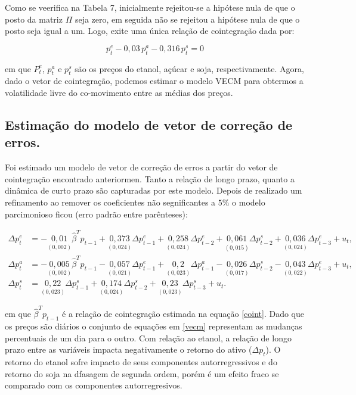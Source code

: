 \documentclass[]{article}
\begin{document}
Como se veerifica na Tabela 7, inicialmente rejeitou-se a hipótese nula
de que o posto da matriz \(\Pi\) seja zero, em seguida não se rejeitou a
hipótese nula de que o posto seja igual a um. Logo, exite uma única
relação de cointegração dada por:

\begin{equation}\label{coint}
p_t^e-0,03\,p_t^a-0,316\,p_t^s=0
\end{equation}

em que \(P_t^e\), \(p_t^a\) e \(p_t^s\) são os preços do etanol, açúcar
e soja, respectivamente. Agora, dado o vetor de cointegração, podemos
estimar o modelo VECM para obtermos a volatilidade livre do co-movimento
entre as médias dos preços.

\subsection{Estimação do modelo de vetor de correção de
erros.}\label{estimacao-do-modelo-de-vetor-de-correcao-de-erros.}

Foi estimado um modelo de vetor de correção de erros a partir do vetor
de cointegração encontrado anteriormen. Tanto a relação de longo prazo,
quanto a dinâmica de curto prazo são capturadas por este modelo. Depois
de realizado um refinamento ao remover os coeficientes não segnificantes
a \(5\%\) o modelo parcimonioso ficou (erro padrão entre parênteses):

\begin{align}\label{vecm}
\Delta p_t^e &=-\underset{(0,002)}{0,01}\hat{\beta}^Tp_{t-1}+\underset{(0,024)}{0,373}\Delta p_{t-1}^e+\underset{(0,024)}{0,258}\Delta p_{t-2}^e+\underset{(0,015)}{0,061}\Delta p^s_{t-2}+\underset{(0,024)}{0,036}\Delta p^e_{t-3}+u_t,\nonumber\\
\Delta p_t^a &=-\underset{(0,002)}{0,005}\hat{\beta}^Tp_{t-1}-\underset{(0,021)}{0,057}\Delta p^e_{t-1}+\underset{(0,023)}{0,2}\Delta p^a_{t-1}-\underset{(0,017)}{0,026}\Delta p_{t-2}^s-\underset{(0,022)}{0,043}\Delta p_{t-3}^e+u_t,\\
\Delta p_t^s &=\underset{(0,023)}{0,22}\Delta p_{t-1}^s+\underset{(0,024)}{0,174}\Delta p_{t-2}^s+\underset{(0,023)}{0,23}\Delta p_{t-3}^s+u_t.\nonumber
\end{align}

em que \(\hat{\beta}^Tp_{t-1}\) é a relação de cointegração estimada na
equação \eqref{coint}. Dado que os preços são diários o conjunto de
equações em \eqref{vecm} representam as mudanças percentuais de um dia
para o outro. Com relação ao etanol, a relação de longo prazo entre as
variáveis impacta negativamente o retorno do ativo (\(\Delta p_t\)). O
retorno do etanol sofre impacto de seus componentes autorregressivos e
do retorno do soja na dfasagem de segunda ordem, porém é um efeito fraco
se comparado com os componentes autorregresivos.
\end{document}
